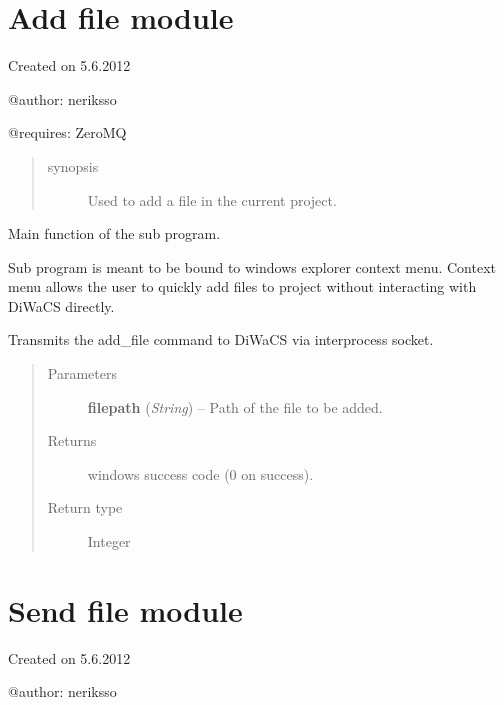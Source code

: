 \documentclass[letterpaper,10pt,english]{sphinxmanual}
\begin{document}
\section{Add file module}
\label{api:add-file-module}\label{api:module-add_file}
Created on 5.6.2012

@author: neriksso

@requires: ZeroMQ
\begin{quote}\begin{description}
\item[{synopsis}] \leavevmode
Used to add a file in the current project.

\end{description}\end{quote}

\begin{fulllineitems}
\label{api:add_file.main}
Main function of the sub program.

Sub program is meant to be bound to windows explorer context menu.
Context menu allows the user to quickly add files to project without
interacting with DiWaCS directly.

Transmits the add\_file command to DiWaCS via interprocess socket.
\begin{quote}\begin{description}
\item[{Parameters}] \leavevmode
\textbf{filepath} (\emph{String}) -- Path of the file to be added.

\item[{Returns}] \leavevmode
windows success code (0 on success).

\item[{Return type}] \leavevmode
Integer

\end{description}\end{quote}

\end{fulllineitems}



\section{Send file module}
\label{api:module-send_file_to}\label{api:send-file-module}
Created on 5.6.2012

@author: neriksso
\end{document}
